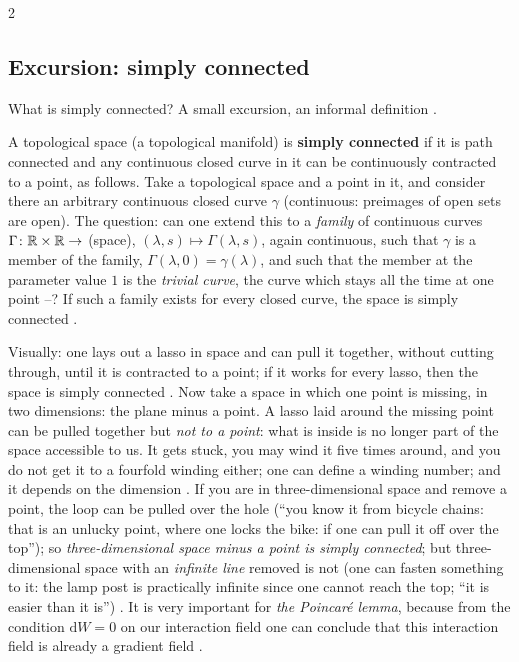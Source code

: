 \begin{paracol}{2}
\subsection{Excursion: simply connected}\label{ssec:ng-simply}

What is simply connected? A small excursion, an informal definition .
\begin{definition}\label{def:ng-simply}
A topological space (a topological manifold) is \textbf{simply connected} if it is path connected and any continuous closed curve in it can be continuously contracted to a point, as follows. Take a topological space and a point in it, and consider there an arbitrary continuous closed curve $\gamma$ (continuous: preimages of open sets are open). The question: can one extend this to a \emph{family} of continuous curves
$\Gamma\colon\mathbb{R}\times\mathbb{R}\to$ (space), $(\lambda,s)\mapsto\Gamma(\lambda,s)$, again continuous, such that $\gamma$ is a member of the family, $\Gamma(\lambda,0)=\gamma(\lambda)$, and such that the member at the parameter value $1$ is the \emph{trivial curve}, the curve which stays all the time at one point --?
If such a family exists for every closed curve, the space is simply connected .
\end{definition}
Visually: one lays out a lasso in space and can pull it together, without cutting through, until it is contracted to a point; if it works for every lasso, then the space is simply connected . Now take a space in which one point is missing, in two dimensions: the plane minus a point. A lasso laid around the missing point can be pulled together but \emph{not to a point}: what is inside is no longer part of the space
accessible to us. It gets stuck, you may wind it five times around, and you do not get it to a fourfold winding either; one can define a winding number; and it depends on the dimension . If you are in three-dimensional space and remove a point, the loop can be pulled over the hole (``you know it from bicycle chains: that is an unlucky point, where one locks the bike: if one can pull it off over the top'');
so \emph{three-dimensional space minus a point is simply connected}; but three-dimensional space with an \emph{infinite line} removed is not (one can fasten something to it: the lamp post is practically infinite since one cannot reach the top; ``it is easier than it is'') .
It is very important for \emph{the Poincar\'e lemma}, because from the condition $\mathrm dW=0$ on our interaction field one can conclude that this interaction field is already a gradient field .


\end{paracol}
